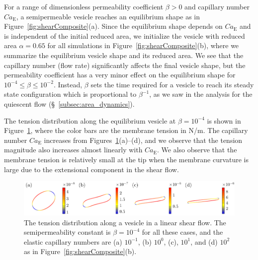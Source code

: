 \documentclass[prb,preprint,showpacs,preprintnumbers,amsmath,amssymb,longbibliography]{revtex4-1}
\newif\ifTikz
\begin{document}
For a range of dimensionless permeability coefficient $\beta>0$ and
capillary number $Ca_\mathrm{E}$, a semipermeable vesicle reaches an
equilibrium shape as in Figure~\ref{fig:shearComposite}(a). Since the
equilibrium shape depends on $Ca_\mathrm{E}$ and is independent of the
initial reduced area, we initialize the vesicle with reduced area
$\alpha = 0.65$ for all simulations in
Figure~\ref{fig:shearComposite}(b), where we summarize the equilibrium
vesicle shape and its reduced area. We see that the capillary number
(flow rate) significantly affects the final vesicle shape, but the
permeability coefficient has a very minor effect on the equilibrium
shape for $10^{-4}\le\beta\le 10^{-2}$. Instead, $\beta$ sets the time
required for a vesicle to reach its steady state configuration which is
proportional to $\beta^{-1}$, as we saw in the analysis for the
quiescent flow (\S~\ref{subsec:area_dynamics}).

The tension distribution along the equilibrium vesicle at
$\beta=10^{-4}$ is shown in Figure~\ref{fig:shearTensions}, where the
color bars are the membrane tension in N/m. The capillary number
$Ca_\mathrm{E}$ increases from Figures~\ref{fig:shearTensions}(a)--(d),
and we observe that the tension magnitude also increases almost linearly
with $Ca_\mathrm{E}$. We also observe that the membrane tension is
relatively small at the tip when the membrane curvature is large due to
the extensional component in the shear flow.
\begin{figure}[htp]
  \centering
  \ifTikz
  
  \else
  \includegraphics{figures/shearTensions.pdf}
  \fi
  \caption{\label{fig:shearTensions} The tension distribution along a
  vesicle in a linear shear flow. The semipermeability constant is
  $\beta = 10^{-4}$ for all these cases, and the elastic capillary
  numbers are (a) $10^{-1}$, (b) $10^{0}$, (c), $10^{1}$, and (d)
  $10^{2}$ as in Figure~\ref{fig:shearComposite}(b).}
\end{figure}

\end{document}
